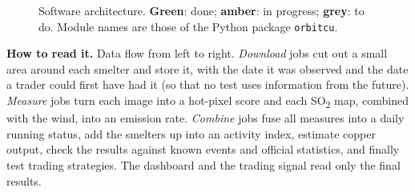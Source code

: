 \documentclass[10pt,a4paper]{article}
\newcommand{\SOtwo}{SO\textsubscript{2}}
\newcommand{\code}[1]{\texttt{\small #1}}
\begin{document}
\begin{figure}[H]
{}
\caption{Software architecture. \textcolor{done}{\textbf{Green}}: done; \textcolor{wip}{\textbf{amber}}: in progress; \textcolor{todo}{\textbf{grey}}: to do. Module names are those of the Python package \code{orbitcu}.}
\label{fig:archi}
\end{figure}

\textbf{How to read it.} Data flow from left to right. \emph{Download} jobs cut out a small area around each smelter and store it, with the date it was observed and the date a trader could first have had it (so that no test uses information from the future). \emph{Measure} jobs turn each image into a hot-pixel score and each \SOtwo{} map, combined with the wind, into an emission rate. \emph{Combine} jobs fuse all measures into a daily running status, add the smelters up into an activity index, estimate copper output, check the results against known events and official statistics, and finally test trading strategies. The dashboard and the trading signal read only the final results.
\end{document}
